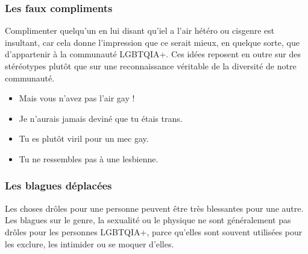 \documentclass[12pt,openany]{book}
\begin{document}
\subsubsection*{Les faux compliments}

\noindent Complimenter quelqu’un en lui disant qu’iel a l’air hétéro ou cisgenre est insultant, car cela donne l’impression que ce serait mieux, en quelque sorte, que d’appartenir à la communauté \mbox{LGBTQIA+}. Ces idées reposent en outre sur des stéréotypes plutôt que sur une reconnaissance véritable de la diversité de notre communauté.

\begin{figure}[h]
    \centering
\end{figure}
\begin{itemize}[label=\textbullet]
  \setlength\itemsep{-0.3em}
  \item Mais vous n’avez pas l’air gay !
  \item Je n’aurais jamais deviné que tu étais trans.
  \item Tu es plutôt viril pour un mec gay.
  \item Tu ne ressembles pas à une lesbienne.
\end{itemize}

\subsubsection*{Les blagues déplacées} 

\noindent Les choses drôles pour une personne peuvent être très blessantes pour une autre. Les blagues sur le genre, la sexualité ou le physique ne sont généralement pas drôles pour les personnes \mbox{LGBTQIA+}, parce qu’elles sont souvent utilisées pour les exclure, les intimider ou se moquer d’elles.
\end{document}
